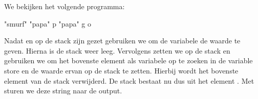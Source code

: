 \begin{exmp}
	We bekijken het volgende programma:
	\begin{smurf}"smurf" "papa" p "papa" g o\end{smurf}
	Nadat  en  op de stack zijn gezet gebruiken we
	 om de variabele  de waarde  te geven.
	Hierna is de stack weer leeg. Vervolgens zetten we  op de stack en
	gebruiken we  om het bovenste element als variabele op te
	zoeken in de variable store en de waarde ervan op de stack te zetten.
	Hierbij wordt het bovenste element van de stack verwijderd. De stack bestaat
	nu dus uit het element . Met  sturen we deze string
	naar de output.
\end{exmp}




